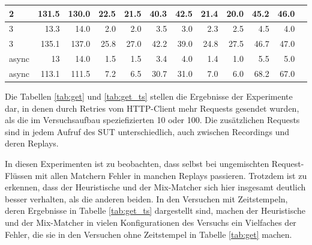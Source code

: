 \documentclass[12pt,a4paper]{report}
\begin{document}
\begin{table}[H]
\begin{tabular}{|l|r|r|r|r|r|r|r|r|r|r|r|}
		2                        & 131.5                          & 130.0                          & 22.5                          & 21.5                          & 40.3                            & 42.5 & 21.4 & 20.0 & 45.2 & 46.0 \\ \hline
		3                        & 13.3                           & 14.0                           & 2.0                           & 2.0                           & 3.5                             & 3.0  & 2.3  & 2.5  & 4.5  & 4.0  \\ \hline
		3                        & 135.1                          & 137.0                          & 25.8                          & 27.0                          & 42.2                            & 39.0 & 24.8 & 27.5 & 46.7 & 47.0 \\ \hline
		async                    & 13                             & 14.0                           & 1.5                           & 1.5                           & 3.4                             & 4.0  & 1.4  & 1.0  & 5.5  & 5.0  \\ \hline
		async                    & 113.1                          & 111.5                          & 7.2                           & 6.5                           & 30.7                            & 31.0 & 7.0  & 6.0  & 68.2 & 67.0 \\ \hline
	\end{tabular}
\end{table}

Die Tabellen \ref{tab:get} und \ref{tab:get_ts} stellen die Ergebnisse der Experimente dar, in denen durch Retries vom HTTP-Client
mehr Requests gesendet wurden, als die im Versuchsaufbau speziefizierten 10 oder 100. Die zusätzlichen Requests sind in jedem
Aufruf des SUT unterschiedlich, auch zwischen Recordings und deren Replays.

In diesen Experimenten ist zu beobachten, dass selbst bei ungemischten Request-Flüssen mit allen Matchern Fehler in manchen
Replays passieren. Trotzdem ist zu erkennen, dass der Heuristische und der Mix-Matcher sich hier insgesamt deutlich besser
verhalten, als die anderen beiden. In den Versuchen mit Zeitstempeln, deren Ergebnisse in Tabelle \ref{tab:get_ts} dargestellt
sind, machen der Heuristische und der Mix-Matcher in vielen Konfigurationen des Versuchs ein Vielfaches der Fehler, die sie in den
Versuchen ohne Zeitstempel in Tabelle \ref{tab:get} machen.
\end{document}
